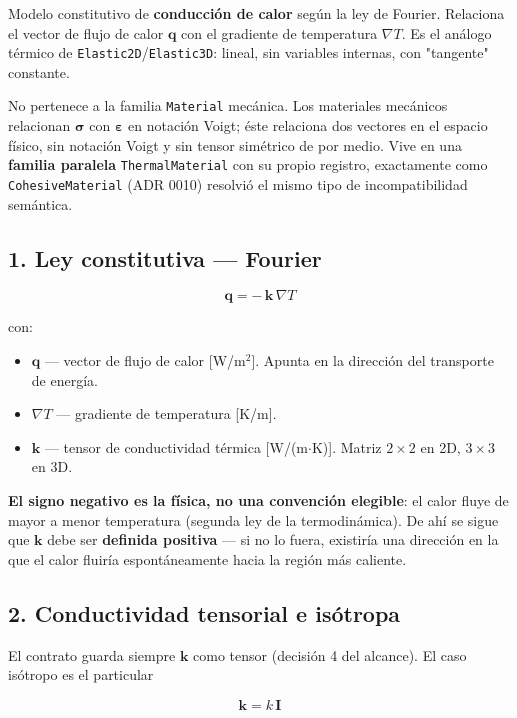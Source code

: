 \documentclass[11pt,letterpaper,oneside]{report}
\begin{document}
Modelo constitutivo de \textbf{conducción de calor} según la ley de Fourier. Relaciona el vector de flujo de calor $\mathbf q$ con el gradiente de temperatura $\nabla T$. Es el análogo térmico de \texttt{Elastic2D}/\texttt{Elastic3D}: lineal, sin variables internas, con "tangente" constante.

No pertenece a la familia \texttt{Material} mecánica. Los materiales mecánicos relacionan $\boldsymbol\sigma$ con $\boldsymbol\varepsilon$ en notación Voigt; éste relaciona dos vectores en el espacio físico, sin notación Voigt y sin tensor simétrico de por medio. Vive en una \textbf{familia paralela} \texttt{ThermalMaterial} con su propio registro, exactamente como \texttt{CohesiveMaterial} (ADR 0010) resolvió el mismo tipo de incompatibilidad semántica.

\subsection{1. Ley constitutiva --- Fourier}

\[
\mathbf q = -\,\mathbf k\, \nabla T
\]

con:

\begin{itemize}
  \item $\mathbf q$ --- vector de flujo de calor [W/m\ensuremath{^{2}}]. Apunta en la dirección del transporte de energía.
  \item $\nabla T$ --- gradiente de temperatura [K/m].
  \item $\mathbf k$ --- tensor de conductividad térmica [W/(m\ensuremath{\cdot}K)]. Matriz $2\times2$ en 2D, $3\times3$ en 3D.
\end{itemize}

\textbf{El signo negativo es la física, no una convención elegible}: el calor fluye de mayor a menor temperatura (segunda ley de la termodinámica). De ahí se sigue que $\mathbf k$ debe ser \textbf{definida positiva} --- si no lo fuera, existiría una dirección en la que el calor fluiría espontáneamente hacia la región más caliente.

\subsection{2. Conductividad tensorial e isótropa}

El contrato guarda siempre $\mathbf k$ como tensor (decisión 4 del alcance). El caso isótropo es el particular

\[
\mathbf k = k\,\mathbf I
\]
\end{document}
